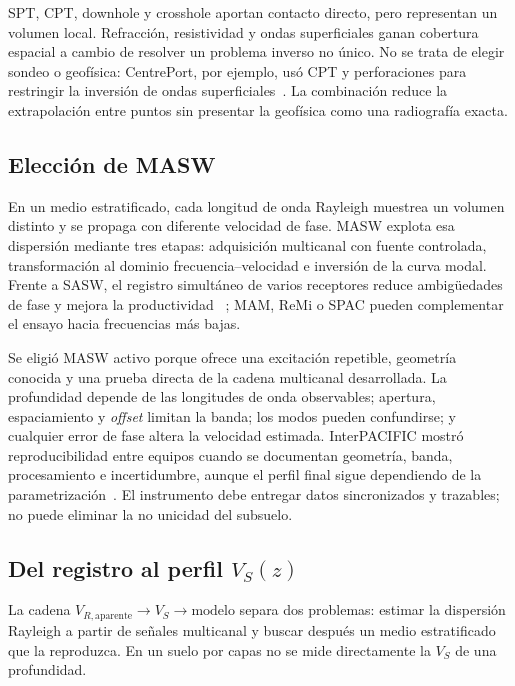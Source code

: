 SPT, CPT, downhole y crosshole aportan contacto directo, pero representan un volumen
local. Refracción, resistividad y ondas superficiales ganan cobertura espacial a cambio
de resolver un problema inverso no único. No se trata de elegir sondeo o geofísica:
CentrePort, por ejemplo, usó CPT y perforaciones para restringir la inversión de ondas
superficiales~\cite{Vantassel2018}. La combinación reduce la extrapolación entre puntos
sin presentar la geofísica como una radiografía exacta.

\subsection{Elección de MASW}

En un medio estratificado, cada longitud de onda Rayleigh muestrea un volumen distinto y
se propaga con diferente velocidad de fase. MASW explota esa dispersión mediante tres
etapas: adquisición multicanal con fuente controlada, transformación al dominio
frecuencia--velocidad e inversión de la curva modal. Frente a SASW, el registro
simultáneo de varios receptores reduce ambigüedades de fase y mejora la productividad
~\cite{Park1999}; MAM, ReMi o SPAC pueden complementar el ensayo hacia frecuencias más
bajas.

Se eligió MASW activo porque ofrece una excitación repetible, geometría conocida y una
prueba directa de la cadena multicanal desarrollada. La profundidad depende de las
longitudes de onda observables; apertura, espaciamiento y \emph{offset} limitan la banda;
los modos pueden confundirse; y cualquier error de fase altera la velocidad estimada.
InterPACIFIC mostró reproducibilidad entre equipos cuando se documentan geometría,
banda, procesamiento e incertidumbre, aunque el perfil final sigue dependiendo de la
parametrización~\cite{Foti2018}. El instrumento debe entregar datos sincronizados y
trazables; no puede eliminar la no unicidad del subsuelo.

\subsection{Del registro al perfil \texorpdfstring{$V_S(z)$}{Vs(z)}}

La cadena $V_{R,\mathrm{aparente}}\rightarrow V_S\rightarrow\text{modelo}$ separa dos
problemas: estimar la dispersión Rayleigh a partir de señales multicanal y buscar
después un medio estratificado que la reproduzca. En un suelo por capas no se mide
directamente la $V_S$ de una profundidad.

